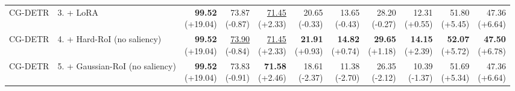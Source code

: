 \documentclass{article}
\begin{document}
{\begin{tabular}{llrrrrrrrrr}
CG-DETR & 3. + LoRA & \shortstack{\textbf{99.52} \\ {\scriptsize (+19.04)}} & \shortstack{73.87 \\ {\scriptsize (-0.87)}} & \shortstack{\underline{71.45} \\ {\scriptsize (+2.33)}} & \shortstack{20.65 \\ {\scriptsize (-0.33)}} & \shortstack{13.65 \\ {\scriptsize (-0.43)}} & \shortstack{28.20 \\ {\scriptsize (-0.27)}} & \shortstack{12.31 \\ {\scriptsize (+0.55)}} & \shortstack{51.80 \\ {\scriptsize (+5.45)}} & \shortstack{47.36 \\ {\scriptsize (+6.64)}} \\
CG-DETR & 4. + Hard-RoI (no saliency) & \shortstack{\textbf{99.52} \\ {\scriptsize (+19.04)}} & \shortstack{\underline{73.90} \\ {\scriptsize (-0.84)}} & \shortstack{\underline{71.45} \\ {\scriptsize (+2.33)}} & \shortstack{\textbf{21.91} \\ {\scriptsize (+0.93)}} & \shortstack{\textbf{14.82} \\ {\scriptsize (+0.74)}} & \shortstack{\textbf{29.65} \\ {\scriptsize (+1.18)}} & \shortstack{\textbf{14.15} \\ {\scriptsize (+2.39)}} & \shortstack{\textbf{52.07} \\ {\scriptsize (+5.72)}} & \shortstack{\textbf{47.50} \\ {\scriptsize (+6.78)}} \\
CG-DETR & 5. + Gaussian-RoI (no saliency) & \shortstack{\textbf{99.52} \\ {\scriptsize (+19.04)}} & \shortstack{73.83 \\ {\scriptsize (-0.91)}} & \shortstack{\textbf{71.58} \\ {\scriptsize (+2.46)}} & \shortstack{18.61 \\ {\scriptsize (-2.37)}} & \shortstack{11.38 \\ {\scriptsize (-2.70)}} & \shortstack{26.35 \\ {\scriptsize (-2.12)}} & \shortstack{10.39 \\ {\scriptsize (-1.37)}} & \shortstack{51.69 \\ {\scriptsize (+5.34)}} & \shortstack{47.36 \\ {\scriptsize (+6.64)}} \\

\end{tabular}}
\end{document}
